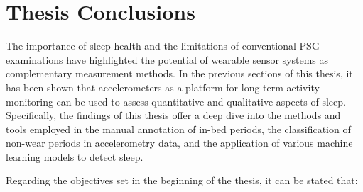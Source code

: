 \documentclass[
  10pt,
]{scrbook}
\begin{document}
\hypertarget{thesis-conclusions}{%
\chapter{Thesis Conclusions}\label{thesis-conclusions}}

The importance of sleep health and the limitations of conventional PSG
examinations have highlighted the potential of wearable sensor systems
as complementary measurement methods. In the previous sections of this
thesis, it has been shown that accelerometers as a platform for
long-term activity monitoring can be used to assess quantitative and
qualitative aspects of sleep. Specifically, the findings of this thesis
offer a deep dive into the methods and tools employed in the manual
annotation of in-bed periods, the classification of non-wear periods in
accelerometry data, and the application of various machine learning
models to detect sleep.

Regarding the objectives set in the beginning of the thesis, it can be
stated that:
\end{document}
